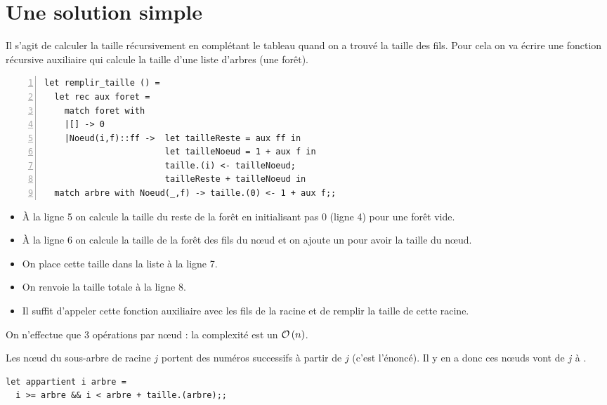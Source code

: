 \section{Une solution simple}
\begin{Exercise}

Il s'agit de calculer la taille récursivement en complétant le tableau quand on a trouvé la taille des fils. Pour cela on va écrire une fonction récursive auxiliaire qui calcule la taille d'une liste d'arbres (une forêt).
\begin{lstlisting}[numbers=left]
let remplir_taille () =
  let rec aux foret =
    match foret with
    |[] -> 0
    |Noeud(i,f)::ff -> 	let tailleReste = aux ff in
                        let tailleNoeud = 1 + aux f in
                        taille.(i) <- tailleNoeud;
                        tailleReste + tailleNoeud in
  match arbre with Noeud(_,f) -> taille.(0) <- 1 + aux f;;
\end{lstlisting}
  
\begin{itemize}
  \item À la ligne 5 on calcule la taille du reste de la forêt en initialisant pas 0 (ligne 4) pour une forêt vide.
  \item À la ligne 6 on calcule la taille de la forêt des fils du nœud et on ajoute un pour avoir la taille du nœud.
  \item On place cette taille dans la liste à la ligne 7.
  \item On renvoie la taille totale à la ligne 8.
  \item Il suffit d'appeler cette fonction auxiliaire avec les fils de la racine et de remplir la taille de cette racine.
\end{itemize}

On n'effectue que 3 opérations par nœud : la complexité est un ${\cal O}\left(n\right)$.
\end{Exercise}
\begin{Exercise}
Les nœud du sous-arbre de racine $j$ portent des numéros successifs à partir de $j$ (c'est l'énoncé). Il y en a  donc ces nœuds vont de $j$ à .

\begin{lstlisting}
let appartient i arbre =
  i >= arbre && i < arbre + taille.(arbre);;
\end{lstlisting}
\end{Exercise}
